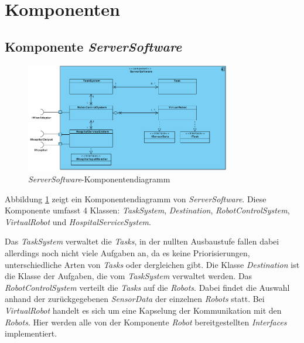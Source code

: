 \section{Komponenten}

\subsection{Komponente \textit{ServerSoftware}}
\begin{figure}[H]
\centering
\includegraphics[width=0.8\textwidth]{img/1-Entwurf-5-ServerSoftware}
\caption{\emph{ServerSoftware}-Komponentendiagramm}
\label{KomponentenStruktur1}
\end{figure}
Abbildung \ref{KomponentenStruktur1} zeigt ein Komponentendiagramm von \emph{ServerSoftware}. Diese Komponente umfasst 4 Klassen: \textit{TaskSystem}, \textit{Destination}, \textit{RobotControlSystem}, \textit{VirtualRobot} und \textit{HospitalServiceSystem}.


Das \textit{TaskSystem} verwaltet die \textit{Tasks}, in der nullten Ausbaustufe fallen dabei allerdings noch nicht viele Aufgaben an,
da es keine Priorisierungen, unterschiedliche Arten von \textit{Tasks} oder dergleichen gibt. Die Klasse \textit{Destination} ist die Klasse
der Aufgaben, die vom \textit{TaskSystem} verwaltet werden. Das \textit{RobotControlSystem} verteilt die \textit{Tasks} auf die \textit{Robots}.
Dabei findet die Auswahl anhand der zurückgegebenen \textit{SensorData} der einzelnen \textit{Robots} statt. Bei \textit{VirtualRobot} handelt
es sich um eine Kapselung der Kommunikation mit den \textit{Robots}. Hier werden alle von der Komponente \textit{Robot} bereitgestellten
\textit{Interfaces} implementiert.
